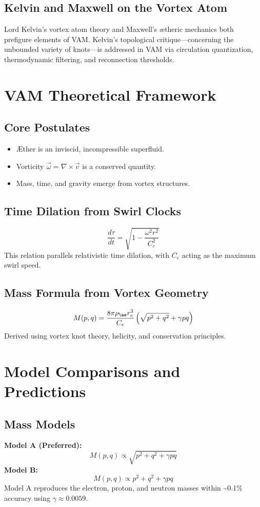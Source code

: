 \documentclass[12pt]{article}
\begin{document}
    \subsection{Kelvin and Maxwell on the Vortex Atom}
    Lord Kelvin's vortex atom theory and Maxwell’s ætheric mechanics both prefigure elements of VAM. Kelvin's topological critique—concerning the unbounded variety of knots—is addressed in VAM via circulation quantization, thermodynamic filtering, and reconnection thresholds.

    \section{VAM Theoretical Framework}
    \subsection{Core Postulates}
    \begin{itemize}
        \item Æther is an inviscid, incompressible superfluid.
        \item Vorticity \(\vec{\omega} = \nabla \times \vec{v}\) is a conserved quantity.
        \item Mass, time, and gravity emerge from vortex structures.
    \end{itemize}

    \subsection{Time Dilation from Swirl Clocks}
    \[
        \frac{d\tau}{dt} = \sqrt{1 - \frac{\omega^2 r^2}{C_e^2}}
    \]
    This relation parallels relativistic time dilation, with \(C_e\) acting as the maximum swirl speed.

    \subsection{Mass Formula from Vortex Geometry}
    \[
        M(p, q) = \frac{8 \pi \rho_{\ae} r_c^3}{C_e} \left( \sqrt{p^2 + q^2} + \gamma pq \right)
    \]
    Derived using vortex knot theory, helicity, and conservation principles.

    \section{Model Comparisons and Predictions}
    \subsection{Mass Models}
    \textbf{Model A (Preferred):}
    \[
        M(p, q) \propto \sqrt{p^2 + q^2 + \gamma pq}
    \]
    \textbf{Model B:}
    \[
        M(p, q) \propto p^2 + q^2 + \gamma pq
    \]
    Model A reproduces the electron, proton, and neutron masses within \textasciitilde0.1\% accuracy using \(\gamma \approx 0.0059\).
\end{document}
